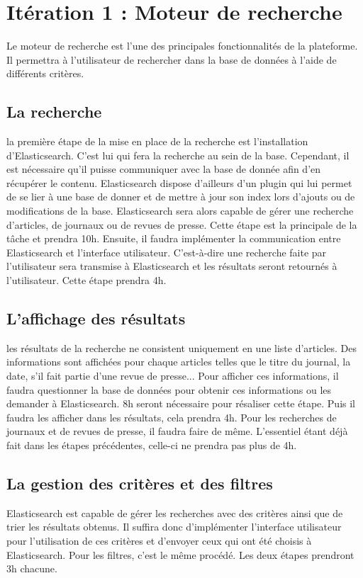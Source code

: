\section{Itération 1 : Moteur de recherche}

Le moteur de recherche est l'une des principales fonctionnalités de la plateforme. Il permettra à l'utilisateur de rechercher dans la base de données à l'aide de différents critères.

	\subsection{La recherche} 
		la première étape de la mise en place de la recherche est l'installation d'Elasticsearch. C'est lui qui fera la recherche au sein de la base. Cependant, il est nécessaire qu'il puisse communiquer avec la base de donnée afin d'en récupérer le contenu. Elasticsearch dispose d'ailleurs d'un plugin qui lui permet de se lier à une base de donner et de mettre à jour son index lors d'ajouts ou de modifications de la base. Elasticsearch sera alors capable de gérer une recherche d'articles, de journaux ou de revues de presse. Cette étape est la principale de la tâche et prendra 10h. Ensuite, il faudra implémenter la communication entre Elasticsearch et l'interface utilisateur. C'est-à-dire une recherche faite par l'utilisateur sera transmise à Elasticsearch et les résultats seront retournés à l'utilisateur. Cette étape prendra 4h.

	\subsection{L'affichage des résultats} 
		les résultats de la recherche ne consistent uniquement en une liste d'articles. Des informations sont affichées pour chaque articles telles que le titre du journal, la date, s'il fait partie d'une revue de presse... Pour afficher ces informations, il faudra questionner la base de données pour obtenir ces informations ou les demander à Elasticsearch. 8h seront nécessaire pour résaliser cette étape. Puis il faudra les afficher dans les résultats, cela prendra 4h. Pour les recherches de journaux et de revues de presse, il faudra faire de même. L'essentiel étant déjà fait dans les étapes précédentes, celle-ci ne prendra pas plus de 4h. 

	\subsection{La gestion des critères et des filtres} 
		Elasticsearch est capable de gérer les recherches avec des critères ainsi que de trier les résultats obtenus.  Il suffira donc d'implémenter l'interface utilisateur pour l'utilisation de ces critères et d'envoyer ceux qui ont été choisis à Elasticsearch. Pour les filtres, c'est le même procédé. Les deux étapes prendront 3h chacune.